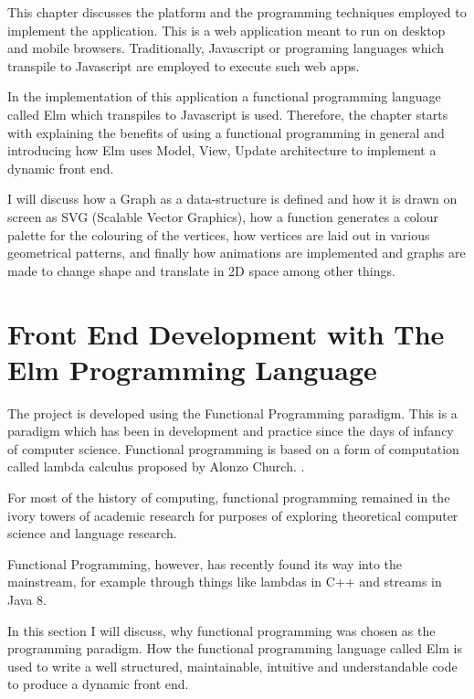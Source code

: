 \graphicspath{ {images/} }

This chapter discusses the platform and the programming techniques employed to
implement the application.  This is a web application meant to run
on desktop and mobile browsers. Traditionally, Javascript or programing languages which transpile
to Javascript are employed to execute such web apps. 

In the implementation of this application a functional programming language
called Elm which transpiles to Javascript is used. Therefore, the chapter
starts with explaining the benefits of using a functional programming in general
and introducing how Elm uses Model, View, Update architecture to implement a dynamic
front end.

I will discuss how a Graph as a
data-structure is defined and how it is drawn on screen as SVG (Scalable Vector
Graphics), how a function generates a colour palette for the colouring of the
vertices, how vertices are laid out in various geometrical patterns, and finally how
animations are implemented and graphs are made to change shape and translate in
2D space among other things.


\section{Front End Development with The Elm Programming Language}

The project is developed using the Functional Programming paradigm. This is a
paradigm which has been in development and practice since the days of infancy
of computer science. Functional programming is based on a form of computation
called lambda calculus proposed by Alonzo Church. \citep{Hudak2007}.

For most of the history of computing, functional programming remained in the
ivory towers of academic research for purposes of exploring theoretical computer
science and language research.

Functional Programming, however, has recently found its way into the
mainstream, for example through things like lambdas in C++ and streams in Java 8.


In this section I will discuss, why functional programming was chosen as the
programming paradigm. How the functional programming language called
Elm is used to write a well structured, maintainable, intuitive and
understandable code to produce a dynamic front end.

